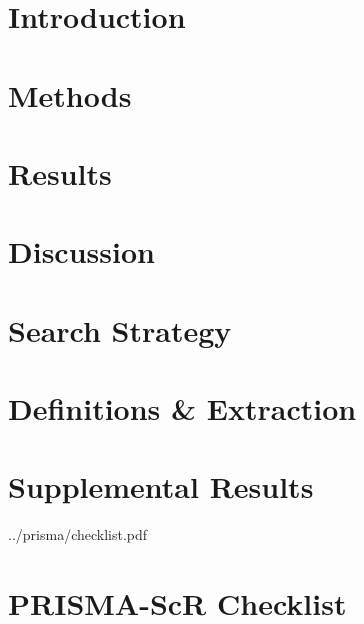 \documentclass{aids}
\begin{document}
\maketitle
\begin{abstract}\end{abstract}
\section{Introduction} \label{s:intro} 
\section{Methods}      \label{s:meth}  
\section{Results}      \label{s:res}   
\section{Discussion}   \label{s:disc}  
\backmatter
\printbibliography
\appendix
\clearpage
\section{Search Strategy}           \label{a:search}    \clearpage
\section{Definitions \& Extraction} \label{a:defs}        \clearpage
\section{Supplemental Results}      \label{a:results}  \clearpage
{}
{../prisma/checklist.pdf}
{\section{PRISMA-ScR Checklist}\label{a:prisma}}
\printbibliography
\end{document}
